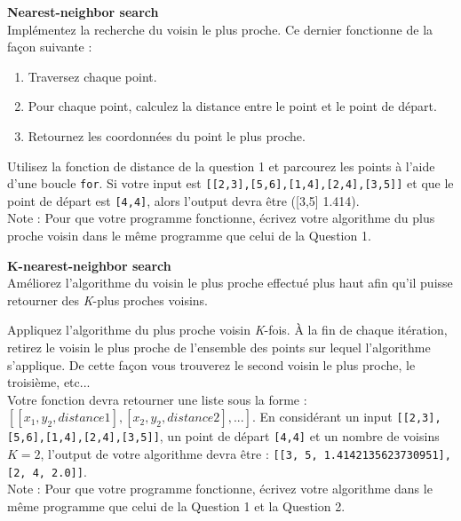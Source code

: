 \begin{Exercice}[10 minutes]\textbf{Nearest-neighbor search}\\

Implémentez la recherche du voisin le plus proche. Ce dernier fonctionne de la façon suivante :
\begin{enumerate}
    \item Traversez chaque point.
    \item Pour chaque point, calculez la distance entre le point et le point de départ.
    \item Retournez les coordonnées du point le plus proche.
\end{enumerate}
    
\begin{conseil}
    Utilisez la fonction de distance de la question 1 et parcourez les points à l'aide d'une boucle \lstinline{for}. Si votre input est \lstinline{[[2,3],[5,6],[1,4],[2,4],[3,5]]} et que le point de départ est \lstinline{[4,4]}, alors l'output devra être ([3,5] 1.414).\\
    
    Note : Pour que votre programme fonctionne, écrivez votre algorithme du plus proche voisin dans le même programme que celui de la Question 1.
\end{conseil}
\begin{solution}
    
\end{solution}
\end{Exercice}


\begin{Exercice}[15 minutes]\textbf{K-nearest-neighbor search}\\


Améliorez l'algorithme du voisin le plus proche effectué plus haut afin qu'il puisse retourner des \textit{K}-plus proches voisins.\\

\begin{conseil}
Appliquez l'algorithme du plus proche voisin \textit{K}-fois. À la fin de chaque itération, retirez le voisin le plus proche de l'ensemble des points sur lequel l'algorithme s'applique. De cette façon vous trouverez le second voisin le plus proche, le troisième, etc...\\

Votre fonction devra retourner une liste sous la forme : $[[x_1,y_2, distance1],[x_2,y_2,distance2],...]$. En considérant un input \lstinline{[[2,3],[5,6],[1,4],[2,4],[3,5]]}, un point de départ \lstinline{[4,4]} et un nombre de voisins $K=2$, l'output de votre algorithme devra être : \lstinline{[[3, 5, 1.4142135623730951], [2, 4, 2.0]]}.\\

Note : Pour que votre programme fonctionne, écrivez votre algorithme dans le même programme que celui de la Question 1 et la Question 2.
\end{conseil}

\begin{solution}
    
\end{solution}
\end{Exercice}
\newpage

